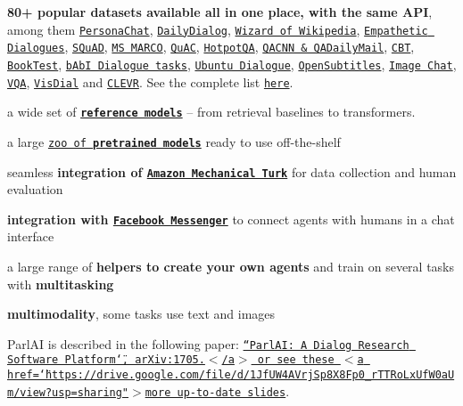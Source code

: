 \begin{DoxyItemize}
\item {\bfseries 80+ popular datasets available all in one place, with the same A\+PI}, among them \href{https://arxiv.org/abs/1801.07243}{\tt Persona\+Chat}, \href{https://arxiv.org/abs/1710.03957}{\tt Daily\+Dialog}, \href{https://openreview.net/forum?id=r1l73iRqKm}{\tt Wizard of Wikipedia}, \href{https://arxiv.org/abs/1811.00207}{\tt Empathetic Dialogues}, \href{https://rajpurkar.github.io/SQuAD-explorer/}{\tt S\+Qu\+AD}, \href{http://www.msmarco.org/}{\tt MS M\+A\+R\+CO}, \href{https://www.aclweb.org/anthology/D18-1241}{\tt Qu\+AC}, \href{https://hotpotqa.github.io/}{\tt Hotpot\+QA}, \href{https://arxiv.org/abs/1506.03340}{\tt Q\+A\+C\+NN \& Q\+A\+Daily\+Mail}, \href{https://arxiv.org/abs/1511.02301}{\tt C\+BT}, \href{https://arxiv.org/abs/1610.00956}{\tt Book\+Test}, \href{https://arxiv.org/abs/1605.07683}{\tt b\+AbI Dialogue tasks}, \href{https://arxiv.org/abs/1506.08909}{\tt Ubuntu Dialogue}, \href{http://opus.lingfil.uu.se/OpenSubtitles.php}{\tt Open\+Subtitles}, \href{https://arxiv.org/abs/1811.00945}{\tt Image Chat}, \href{http://visualqa.org/}{\tt V\+QA}, \href{https://arxiv.org/abs/1611.08669}{\tt Vis\+Dial} and \href{http://cs.stanford.edu/people/jcjohns/clevr/}{\tt C\+L\+E\+VR}. See the complete list \href{https://github.com/facebookresearch/ParlAI/blob/master/parlai/tasks/task_list.py}{\tt here}.
\item a wide set of \href{https://www.parl.ai/docs/agents_list.html}{\tt {\bfseries reference models}} -- from retrieval baselines to transformers.
\item a large \href{https://parl.ai/docs/zoo.html}{\tt zoo of {\bfseries pretrained models}} ready to use off-\/the-\/shelf
\item seamless {\bfseries integration of \href{https://www.mturk.com/mturk/welcome}{\tt Amazon Mechanical Turk}} for data collection and human evaluation
\item {\bfseries integration with \href{http://www.parl.ai/docs/tutorial_messenger.html}{\tt Facebook Messenger}} to connect agents with humans in a chat interface
\item a large range of {\bfseries helpers to create your own agents} and train on several tasks with {\bfseries multitasking}
\item {\bfseries multimodality}, some tasks use text and images
\end{DoxyItemize}

Parl\+AI is described in the following paper\+: \href{https://arxiv.org/abs/1705.06476}{\tt “\+Parl\+A\+I\+: A Dialog Research Software Platform\char`\"{}, ar\+Xiv\+:1705.$<$/a$>$
or see these $<$a href=\char`\"{}https\+://drive.\+google.\+com/file/d/1\+Jf\+U\+W4\+A\+Vrj\+Sp8\+X8\+Fp0\+\_\+r\+T\+T\+Ro\+Lx\+Uf\+W0a\+Um/view?usp=sharing"$>$more up-\/to-\/date slides}.

